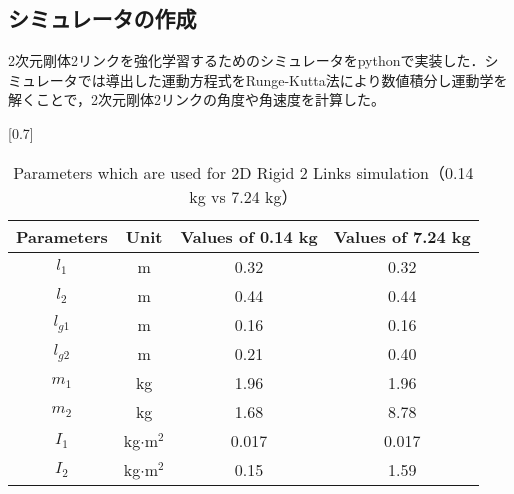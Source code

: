 \begin{small}
\subsection{シミュレータの作成}
2次元剛体2リンクを強化学習するためのシミュレータをpythonで実装した．シミュレータでは導出した運動方程式をRunge-Kutta法\cite{runge-kutta}により数値積分し運動学を解くことで，2次元剛体2リンクの角度や角速度を計算した。
\begin{table}[t]
  \begin{center}
    \caption{Parameters which are used for 2D Rigid 2 Links simulation（0.14 kg vs 7.24 kg）}
    \scalebox{0.7}[0.7]{
    \begin{tabular}{c|c|c|c}
      \hline
      Parameters & Unit & Values of 0.14 kg & Values of 7.24 kg \\
      \hline
      $l_{1}$ & m & 0.32 & 0.32\\
      $l_{2}$ & m & 0.44 & 0.44\\
      $l_{g1}$ & m & 0.16 & 0.16 \\
      $l_{g2}$ & m & 0.21 & 0.40 \\
      $m_{1}$ & kg & 1.96 & 1.96\\
      $m_{2}$ & kg & 1.68 & 8.78 \\
      $I_{1}$ & kg$\cdot$$\mathrm{m}^2$ & 0.017 & 0.017 \\
      $I_{2}$ & kg$\cdot$$\mathrm{m}^2$ & 0.15 & 1.59 \\
      \hline
    \end{tabular}
    }
  \end{center}
\end{table}

\end{small}
